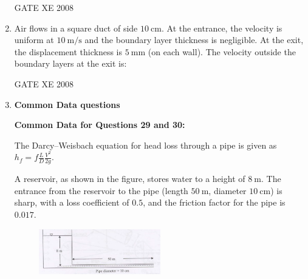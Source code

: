 \documentclass[12pt]{article}
\begin{document}
\begin{enumerate}
\begin{enumerate}
\end{enumerate}

GATE XE 2008
\item Air flows in a square duct of side $10 \ \text{cm}$. At the entrance, the velocity is uniform at $10 \ \text{m/s}$ and the boundary layer thickness is negligible. At the exit, the displacement thickness is $5 \ \text{mm}$ (on each wall). The velocity outside the boundary layers at the exit is:

\begin{enumerate}
\end{enumerate}

GATE XE 2008
\item[] \textbf{\Large Common Data questions}

\textbf{Common Data for Questions 29 and 30:}  

The Darcy–Weisbach equation for head loss through a pipe is given as  
$h_f = f \frac{L}{D} \frac{V^2}{2g}$.  

A reservoir, as shown in the figure, stores water to a height of $8 \ \text{m}$.  
The entrance from the reservoir to the pipe (length $50 \ \text{m}$, diameter $10 \ \text{cm}$) is sharp, with a loss coefficient of $0.5$, and the friction factor for the pipe is $0.017$.  

\begin{figure}[H]
\centering
  \includegraphics[width=0.5\textwidth]{figs/ass1_d_q29.png}
  \caption{}
\end{figure} 


\end{enumerate}
\end{document}
